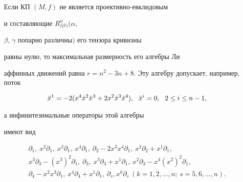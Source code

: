 \begin{thm}


Если КП $(M,f) $ не является проективно-евклидовым


и составляющие $R^{\alpha}_{\beta \beta \gamma}$\linebreak $(\alpha $,


$\beta $, $\gamma$ попарно различны$)$ его тензора кривизны


равны нулю, то максимальная размерность его алгебры Ли


аффинных движений равна $r=n^2-3n+8$. Эту алгебру допускает, например, поток


$$


\Ddot{x}^1=-2(x^4\dot{x}^2\dot{x}^3+2 x^2\dot{x}^3\dot{x}^4),\ \


\Ddot{x}^i=0,\ \ 2\leq i\leq n-1,


$$


а инфинитезимальные операторы этой алгебры


имеют вид


\begin{gather*}


\partial_1,\ x^2\partial_1,\ x^3\partial_1, \ x^4\partial_1,\


\partial_2-2x^3x^4\partial_1,\ x^2


\partial_2+x^1 \partial_1,\\


x^3 \partial_3-(x^3)^2\partial_1,\ \partial_3,\ x^3


\partial_3+ x^1 \partial_1,\ x^2 \partial_3-x^4(x^2)^2 \partial_1,\\


\partial_4-x^2x^3 \partial_1,\ x^4 \partial_4+ x^1 \partial_1,\


\partial_s,x^k \partial_s\  (k=1,2,\dotsc,n;\ s=5,6,\dotsc,n).


\end{gather*}


\end{thm}





